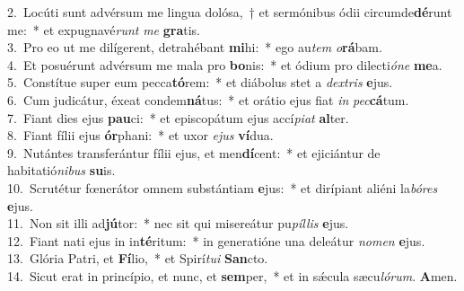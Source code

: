 {2.~}Locúti sunt advérsum me lingua dolósa,~† et sermónibus ódii circumde\textbf{dé}runt me:~* et expugnavé\textit{runt} \textit{me} \textbf{gra}tis.\\
{3.~}Pro eo ut me dilígerent, detrahébant \textbf{mi}hi:~* ego au\textit{tem} \textit{o}\textbf{rá}bam.\\
{4.~}Et posuérunt advérsum me mala pro \textbf{bo}nis:~* et ódium pro dilecti\textit{ó}\textit{ne} \textbf{me}a.\\
{5.~}Constítue super eum pecca\textbf{tó}rem:~* et diábolus stet a \textit{dex}\textit{tris} \textbf{e}jus.\\
{6.~}Cum judicátur, éxeat condem\textbf{ná}tus:~* et orátio ejus fiat \textit{in} \textit{pec}\textbf{cá}tum.\\
{7.~}Fiant dies ejus \textbf{pau}ci:~* et episcopátum ejus accí\textit{pi}\textit{at} \textbf{al}ter.\\
{8.~}Fiant fílii ejus \textbf{ór}phani:~* et uxor \textit{e}\textit{jus} \textbf{ví}dua.\\
{9.~}Nutántes transferántur fílii ejus, et men\textbf{dí}cent:~* et ejiciántur de habitatió\textit{ni}\textit{bus} \textbf{su}is.\\
{10.~}Scrutétur fœnerátor omnem substántiam \textbf{e}jus:~* et dirípiant aliéni la\textit{bó}\textit{res} \textbf{e}jus.\\
{11.~}Non sit illi ad\textbf{jú}tor:~* nec sit qui misereátur pu\textit{píl}\textit{lis} \textbf{e}jus.\\
{12.~}Fiant nati ejus in in\textbf{té}ritum:~* in generatióne una deleátur \textit{no}\textit{men} \textbf{e}jus.\\
{13.~}Glória Patri, et \textbf{Fí}lio,~* et Spirí\textit{tu}\textit{i} \textbf{San}cto.\\
{14.~}Sicut erat in princípio, et nunc, et \textbf{sem}per,~* et in sǽcula sæcu\textit{ló}\textit{rum}. \textbf{A}men.\\
